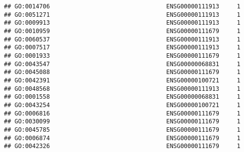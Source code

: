 \documentclass[
]{article}
\begin{document}
\begin{verbatim}
## GO:0014706                                 ENSG00000111913     1
## GO:0051271                                 ENSG00000111913     1
## GO:0009913                                 ENSG00000111913     1
## GO:0010959                                 ENSG00000111679     1
## GO:0060537                                 ENSG00000111913     1
## GO:0007517                                 ENSG00000111913     1
## GO:0001933                                 ENSG00000111679     1
## GO:0043547                                 ENSG00000068831     1
## GO:0045088                                 ENSG00000111679     1
## GO:0042391                                 ENSG00000100721     1
## GO:0048568                                 ENSG00000111913     1
## GO:0001558                                 ENSG00000068831     1
## GO:0043254                                 ENSG00000100721     1
## GO:0006816                                 ENSG00000111679     1
## GO:0030099                                 ENSG00000111679     1
## GO:0045785                                 ENSG00000111679     1
## GO:0006874                                 ENSG00000111679     1
## GO:0042326                                 ENSG00000111679     1
\end{verbatim}
\end{document}
